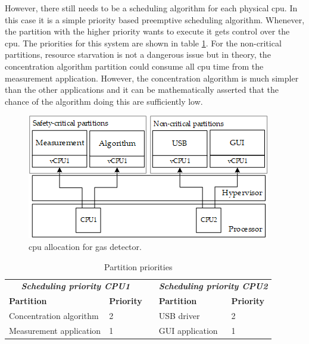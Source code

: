 However, there still needs to be a scheduling algorithm for each physical \acrshort{cpu}. In this case it is a simple priority based preemptive scheduling algorithm. Whenever, the partition with the higher priority wants to execute it gets control over the \acrshort{cpu}. The priorities for this system are shown in table \ref{tab:gasdetect_priorities}. For the non-critical partitions, resource starvation is not a dangerous issue but in theory, the concentration algorithm partition could consume all \acrshort{cpu} time from the measurement application. However, the concentration algorithm is much simpler than the other applications and it can be mathematically asserted that the chance of the algorithm doing this are sufficiently low.

\begin{figure}[ht!]
\centering
\includegraphics[scale=1]{Figures/gas_detect_vcpu_schedule.png}
\decoRule
\caption{\acrshort{cpu} allocation for gas detector.}
\label{fig:gas_detect_vcpu_schedule}
\end{figure}

\begin{table}[hb!]
\centering
\begin{tabular}{lllll}
\multicolumn{2}{c}{\textit{\textbf{Scheduling priority CPU1}}}                         &                       & \multicolumn{2}{c}{\textit{\textbf{Scheduling priority CPU2}}}                   \\ \cline{1-2} \cline{4-5} 
\multicolumn{1}{|l|}{\textbf{Partition}}      & \multicolumn{1}{l|}{\textbf{Priority}} & \multicolumn{1}{l|}{} & \multicolumn{1}{l|}{\textbf{Partition}} & \multicolumn{1}{l|}{\textbf{Priority}} \\ \cline{1-2} \cline{4-5} 
\multicolumn{1}{|l|}{Concentration algorithm} & \multicolumn{1}{l|}{2}                 & \multicolumn{1}{l|}{} & \multicolumn{1}{l|}{USB driver}         & \multicolumn{1}{l|}{2}                 \\ \cline{1-2} \cline{4-5} 
\multicolumn{1}{|l|}{Measurement application} & \multicolumn{1}{l|}{1}                 & \multicolumn{1}{l|}{} & \multicolumn{1}{l|}{GUI application}    & \multicolumn{1}{l|}{1}                 \\ \cline{1-2} \cline{4-5} 
\end{tabular}
\caption{Partition priorities}
\label{tab:gasdetect_priorities}
\end{table}

